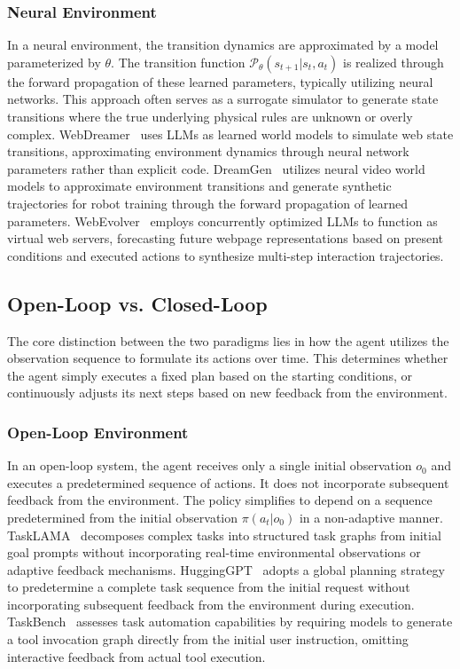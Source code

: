 \documentclass{llmxive}
\begin{document}
\subsubsection{Neural Environment}
In a neural environment, the transition dynamics are approximated by a model parameterized by $\theta$. The transition function $\mathcal{P}_{\theta}(s_{t+1} | s_t, a_t)$ is realized through the forward propagation of these learned parameters, typically utilizing neural networks. This approach often serves as a surrogate simulator to generate state transitions where the true underlying physical rules are unknown or overly complex. WebDreamer~\cite{WebDreamer} uses LLMs as learned world models to simulate web state transitions, approximating environment dynamics through neural network parameters rather than explicit code. DreamGen~\cite{DreamGen} utilizes neural video world models to approximate environment transitions and generate synthetic trajectories for robot training through the forward propagation of learned parameters. WebEvolver~\cite{WebEvolver} employs concurrently optimized LLMs to function as virtual web servers, forecasting future webpage representations based on present conditions and executed actions to synthesize multi-step interaction trajectories.


\subsection{Open-Loop vs. Closed-Loop}
\label{attribute:Open-Loop vs. Closed-Loop}
The core distinction between the two paradigms lies in how the agent utilizes the observation sequence to formulate its actions over time. This determines whether the agent simply executes a fixed plan based on the starting conditions, or continuously adjusts its next steps based on new feedback from the environment.

\subsubsection{Open-Loop Environment}
In an open-loop system, the agent receives only a single initial observation $o_0$ and executes a predetermined sequence of actions. It does not incorporate subsequent feedback from the environment. The policy simplifies to depend on a sequence predetermined from the initial observation $\pi(a_t | o_0)$ in a non-adaptive manner. TaskLAMA~\cite{TaskLAMA} decomposes complex tasks into structured task graphs from initial goal prompts without incorporating real-time environmental observations or adaptive feedback mechanisms. HuggingGPT~\cite{HuggingGPT} adopts a global planning strategy to predetermine a complete task sequence from the initial request without incorporating subsequent feedback from the environment during execution. TaskBench~\cite{TaskBench} assesses task automation capabilities by requiring models to generate a tool invocation graph directly from the initial user instruction, omitting interactive feedback from actual tool execution.
\end{document}
